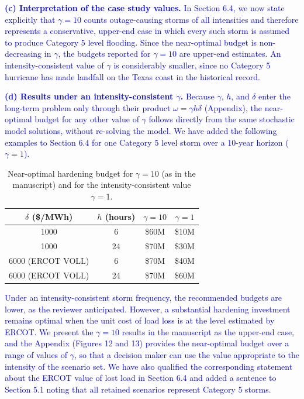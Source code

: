 \documentclass[authoryear,preprint,review,12pt]{elsarticle}\usepackage{amssymb}
\begin{document}
\textcolor{blue}{\textbf{(c) Interpretation of the case study values.} In Section 6.4, we now state explicitly that $\gamma = 10$ counts outage-causing storms of all intensities and therefore represents a conservative, upper-end case in which every such storm is assumed to produce Category 5 level flooding. Since the near-optimal budget is non-decreasing in $\gamma$, the budgets reported for $\gamma = 10$ are upper-end estimates. An intensity-consistent value of $\gamma$ is considerably smaller, since no Category 5 hurricane has made landfall on the Texas coast in the historical record.}

\textcolor{blue}{\textbf{(d) Results under an intensity-consistent $\gamma$.} Because $\gamma$, $h$, and $\delta$ enter the long-term problem only through their product $\omega = \gamma h \delta$ (Appendix), the near-optimal budget for any other value of $\gamma$ follows directly from the same stochastic model solutions, without re-solving the model. We have added the following examples to Section 6.4 for one Category 5 level storm over a 10-year horizon ($\gamma = 1$).}

\begin{table}[htbp]
\centering
\color{blue}
\caption{Near-optimal hardening budget for $\gamma = 10$ (as in the manuscript) and for the intensity-consistent value $\gamma = 1$.}
\label{tab:r3}
\begin{tabular}{|c|c|c|c|}
\hline
$\delta$ (\$/MWh) & $h$ (hours) & $\gamma = 10$ & $\gamma = 1$ \\
\hline
1000 & 6  & \$60M & \$10M \\
1000 & 24 & \$70M & \$30M \\
6000 (ERCOT VOLL) & 6  & \$70M & \$40M \\
6000 (ERCOT VOLL) & 24 & \$70M & \$60M \\
\hline
\end{tabular}
\end{table}

\textcolor{blue}{Under an intensity-consistent storm frequency, the recommended budgets are lower, as the reviewer anticipated. However, a substantial hardening investment remains optimal when the unit cost of load loss is at the level estimated by ERCOT. We present the $\gamma = 10$ results in the manuscript as the upper-end case, and the Appendix (Figures 12 and 13) provides the near-optimal budget over a range of values of $\gamma$, so that a decision maker can use the value appropriate to the intensity of the scenario set. We have also qualified the corresponding statement about the ERCOT value of lost load in Section 6.4 and added a sentence to Section 5.1 noting that all retained scenarios represent Category 5 storms.}
\end{document}
